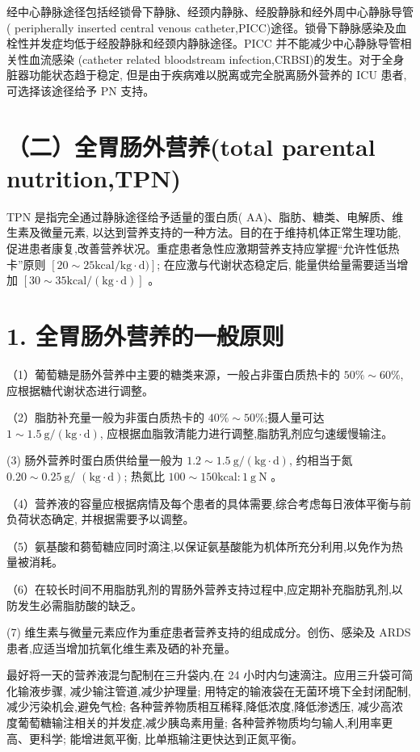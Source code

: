 \documentclass[10pt]{article}
\begin{document}
经中心静脉途径包括经锁骨下静脉、经颈内静脉、经股静脉和经外周中心静脉导管 ( peripherally inserted central venous catheter,PICC)途径。锁骨下静脉感染及血栓性并发症均低于经股静脉和经颈内静脉途径。PICC 并不能减少中心静脉导管相关性血流感染 (catheter related bloodstream infection,CRBSI)的发生。对于全身脏器功能状态趋于稳定, 但是由于疾病难以脱离或完全脱离肠外营养的 ICU 患者, 可选择该途径给予 PN 支持。

\section*{（二）全胃肠外营养(total parental nutrition,TPN)}
TPN 是指完全通过静脉途径给予适量的蛋白质( AA)、脂肪、糖类、电解质、维生素及微量元素, 以达到营养支持的一种方法。目的在于维持机体正常生理功能, 促进患者康复,改善营养状况。重症患者急性应激期营养支持应掌握“允许性低热卡”原则 $[20 \sim 25 \mathrm{kcal} / \mathrm{kg} \cdot \mathrm{d})]$; 在应激与代谢状态稳定后, 能量供给量需要适当增加 $[30 \sim 35 \mathrm{kcal} /(\mathrm{kg} \cdot \mathrm{d})]$ 。

\section*{1. 全胃肠外营养的一般原则}
（1）葡萄糖是肠外营养中主要的糖类来源，一般占非蛋白质热卡的 $50 \% \sim 60 \%$, 应根据糖代谢状态进行调整。

（2）脂肪补充量一般为非蛋白质热卡的 $40 \% \sim 50 \%$;摄人量可达 $1 \sim 1.5 \mathrm{~g} /(\mathrm{kg} \cdot \mathrm{d})$, 应根据血脂敦清能力进行调整,脂肪乳剂应匀速缓慢输注。

(3) 肠外营养时蛋白质供给量一般为 $1.2 \sim 1.5 \mathrm{~g} /(\mathrm{kg} \cdot \mathrm{d})$, 约相当于氮 $0.20 \sim 0.25 \mathrm{~g} /$ $(\mathrm{kg} \cdot \mathrm{d})$; 热氮比 $100 \sim 150 \mathrm{kcal}: 1 \mathrm{~g} \mathrm{~N}$ 。

（4）营养液的容量应根据病情及每个患者的具体需要,综合考虑每日液体平衡与前负荷状态确定, 并根据需要予以调整。

（5）氨基酸和蒭萄糖应同时滴注,以保证氨基酸能为机体所充分利用,以免作为热量被消耗。

（6）在较长时间不用脂肪乳剂的胃肠外营养支持过程中,应定期补充脂肪乳剂,以防发生必需脂肪酸的缺乏。

(7) 维生素与微量元素应作为重症患者营养支持的组成成分。创伤、感染及 ARDS 患者,应适当增加抗氧化维生素及硒的补充量。

最好将一天的营养液混匀配制在三升袋内,在 24 小时内匀速滴注。应用三升袋可简化输液步骤, 减少输注管道,减少护理量; 用特定的输液袋在无菌环境下全封闭配制, 减少污染机会,避免气检; 各种营养物质相互稀释,降低浓度,降低渗透压, 减少高浓度葡萄糖输注相关的并发症,减少胰岛素用量; 各种营养物质均匀输人,利用率更高、更科学; 能增进氮平衡, 比单瓶输注更快达到正氮平衡。
\end{document}
